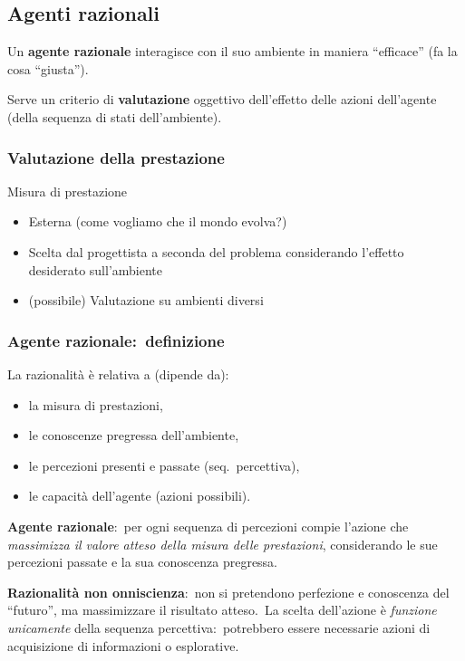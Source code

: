 \subsection{Agenti razionali}
Un \textbf{agente razionale} interagisce con il suo ambiente in maniera ``efficace'' (fa la cosa ``giusta'').\

Serve un criterio di \textbf{valutazione} oggettivo dell'effetto delle azioni dell'agente (della sequenza di stati dell'ambiente).

\subsubsection{Valutazione della prestazione}
Misura di prestazione
\begin{itemize}
	\item Esterna (come vogliamo che il mondo evolva?)
	\item Scelta dal progettista a seconda del problema considerando l'effetto desiderato sull'ambiente
	\item (possibile) Valutazione su ambienti diversi
\end{itemize}

\subsubsection{Agente razionale:\ definizione}
La razionalità è relativa a (dipende da):
\begin{itemize}
	\item la misura di prestazioni,
	\item le conoscenze pregressa dell'ambiente,
	\item le percezioni presenti e passate (seq.\ percettiva),
	\item le capacità dell'agente (azioni possibili).
\end{itemize}

\vspace{12pt}
\noindent\textbf{Agente razionale}:\ per ogni sequenza di percezioni compie l'azione che \textit{massimizza il valore atteso della misura delle prestazioni}, considerando le sue percezioni passate e la sua conoscenza pregressa.

\noindent\textbf{Razionalità non onniscienza}:\ non si pretendono perfezione e conoscenza del ``futuro'', ma massimizzare il risultato atteso.\ La scelta dell'azione è \textit{funzione unicamente} della sequenza percettiva:\ potrebbero essere necessarie azioni di acquisizione di informazioni o esplorative.

